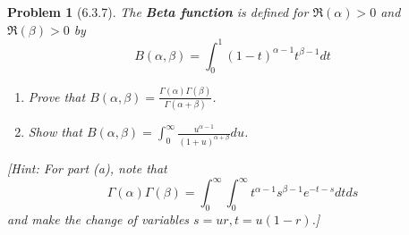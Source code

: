 \documentclass[10pt]{article}
\newcommand{\sk}{\vskip 6mm}
\theoremstyle{plain}
\newtheorem{problem}{Problem}
\theoremstyle{remark}
\begin{document}
\sk

\begin{problem}[6.3.7]
  The \textbf{Beta function} is defined for $\Re\left(\alpha\right)>0$ and
  $\Re\left(\beta\right)>0$ by
  \[
    B\left(\alpha,\beta\right)=\int_0^1\left(1-t\right)^{\alpha-1}t^{\beta-1}dt
  \]
  \begin{enumerate}
  \item[(a)] Prove that
    $B\left(\alpha,\beta\right)=\frac{\Gamma\left(\alpha\right)\Gamma\left(\beta\right)}{\Gamma\left(\alpha+\beta\right)}$.
  \item[(b)] Show that
    $B\left(\alpha,\beta\right)=\int_0^\infty\frac{u^{\alpha-1}}{\left(1+u\right)^{\alpha+\beta}}du$.
  \end{enumerate}
  [Hint: For part (a), note that
  \[
    \Gamma\left(\alpha\right)\Gamma\left(\beta\right)=\int_0^\infty\int_0^\infty t^{\alpha-1}s^{\beta-1}e^{-t-s}dtds
  \]
  and make the change of variables $s=ur,t=u\left(1-r\right)$.]
\end{problem}
\end{document}
